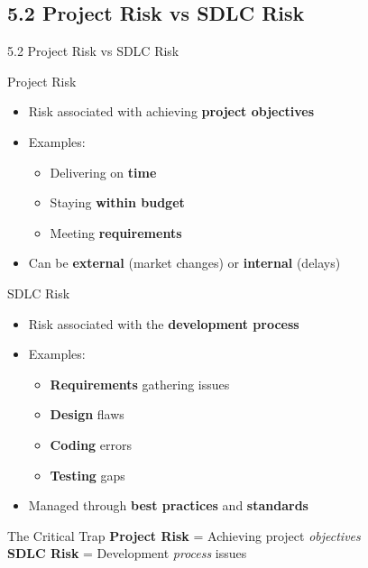 \documentclass{beamer}
\begin{document}
	\subsection{5.2 Project Risk vs SDLC Risk}
	\begin{frame}{5.2 Project Risk vs SDLC Risk}
		\begin{block}{Project Risk}
			\begin{itemize}
				\item Risk associated with achieving \textbf{project objectives}
				\item Examples:
				\begin{itemize}
					\item Delivering on \textbf{time}
					\item Staying \textbf{within budget}
					\item Meeting \textbf{requirements}
				\end{itemize}
				\item Can be \textbf{external} (market changes) or \textbf{internal} (delays)
			\end{itemize}
		\end{block}
		
		\begin{block}{SDLC Risk}
			\begin{itemize}
				\item Risk associated with the \textbf{development process}
				\item Examples:
				\begin{itemize}
					\item \textbf{Requirements} gathering issues
					\item \textbf{Design} flaws
					\item \textbf{Coding} errors
					\item \textbf{Testing} gaps
				\end{itemize}
				\item Managed through \textbf{best practices} and \textbf{standards}
			\end{itemize}
		\end{block}
		
		\begin{alertblock}{The Critical Trap}
			\textbf{Project Risk} = Achieving project \textit{objectives} \\
			\textbf{SDLC Risk} = Development \textit{process} issues
		\end{alertblock}
	\end{frame}
	
\end{document}
